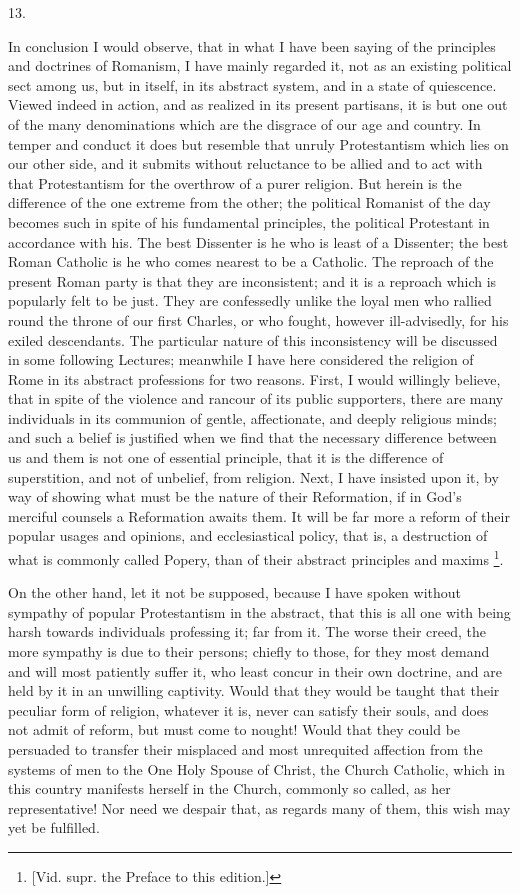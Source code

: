 13.

In conclusion I would observe, that in what I have been saying of
the principles and doctrines of Romanism, I have mainly regarded it,
not as an existing political sect among us, but in itself, in its
abstract system, and in a state of quiescence. Viewed indeed in
action, and as realized in its present partisans, it is but one out of
the many denominations which are the disgrace of our age and country.
In temper and conduct it does but resemble that unruly
Protestantism which lies on our other side, and it submits without
reluctance to be allied and to act with that Protestantism for the
overthrow of a purer religion. But herein is the difference of the one
extreme from the other; the political Romanist of the day becomes such
in spite of his fundamental principles, the political Protestant in
accordance with his. The best Dissenter is he who is least of a
Dissenter; the best Roman Catholic is he who comes nearest to be a
Catholic. The reproach of the present Roman party is that they are
inconsistent; and it is a reproach which is popularly felt to be just.
They are confessedly unlike the loyal men who rallied round the throne
of our first Charles, or who fought, however ill-advisedly, for his
exiled descendants. The particular nature of this inconsistency will
be discussed in some following Lectures; meanwhile I have here
considered the religion of Rome in its abstract professions for two
reasons. First, I would willingly believe, that in spite of the
violence and rancour of its public supporters, there are many
individuals in its communion of gentle, affectionate, and deeply
religious minds; and such a belief is justified when we find that the
necessary difference between us and them is not one of essential
principle, that it is the difference of superstition, and not of
unbelief, from religion. Next, I have insisted upon it, by way of
showing what must be the nature of their Reformation, if in God's
merciful counsels a Reformation awaits them. It will be far more a
reform of their popular usages and opinions, and ecclesiastical
policy, that is, a destruction of what is commonly called Popery, than
of their abstract principles and maxims \footnote{[Vid. supr. the Preface to this edition.]}.

On the other hand, let it not be supposed, because I have spoken
without sympathy of popular Protestantism in the abstract, that
this is all one with being harsh towards individuals professing it;
far from it. The worse their creed, the more sympathy is due to their
persons; chiefly to those, for they most demand and will most
patiently suffer it, who least concur in their own doctrine, and are
held by it in an unwilling captivity. Would that they would be taught
that their peculiar form of religion, whatever it is, never can
satisfy their souls, and does not admit of reform, but must come to
nought! Would that they could be persuaded to transfer their misplaced
and most unrequited affection from the systems of men to the One Holy
Spouse of Christ, the Church Catholic, which in this country manifests
herself in the Church, commonly so called, as her representative! Nor
need we despair that, as regards many of them, this wish may yet be
fulfilled.


